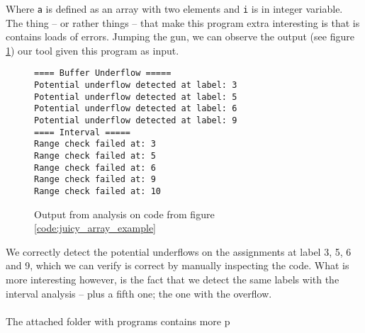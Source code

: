 Where \texttt{a} is defined as an array with two elements and \texttt{i} is in integer variable. The thing -- or rather things -- that make this program extra interesting is that is contains loads of errors. Jumping the gun, we can observe the output (see figure \ref{code:juicy_array_example_output}) our tool given this program as input.
\begin{figure}[H]
  \begin{lstlisting}[numbers=none]
==== Buffer Underflow =====
Potential underflow detected at label: 3
Potential underflow detected at label: 5
Potential underflow detected at label: 6
Potential underflow detected at label: 9
==== Interval =====
Range check failed at: 3
Range check failed at: 5
Range check failed at: 6
Range check failed at: 9
Range check failed at: 10
\end{lstlisting}
\caption{Output from analysis on code from figure \ref{code:juicy_array_example}}
\label{code:juicy_array_example_output}
\end{figure}
We correctly detect the potential underflows on the assignments at label 3, 5, 6 and 9, which we can verify is correct by manually inspecting the code. What is more interesting however, is the fact that we detect the same labels with the interval analysis -- plus a fifth one; the one with the overflow.
\\\\
The attached folder with programs contains more p